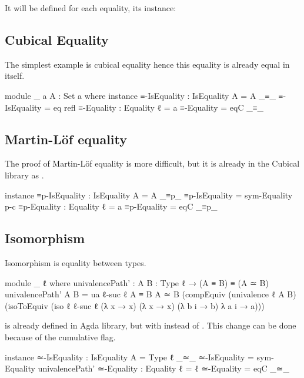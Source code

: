 \documentclass{article}
\begin{document}
It will be defined for each equality, its instance:

\subsection{Cubical Equality}

The simplest example is cubical equality hence this equality is already equal in itself.

\begin{code}
module _ {a} {A : Set a} where
  instance
    ≡-IsEquality : IsEquality {A = A} _≡_
    ≡-IsEquality = eq refl
  ≡-Equality : Equality {ℓ = a}
  ≡-Equality = eqC _≡_

\end{code}

\subsection{Martin-Löf equality}

The proof of Martin-Löf equality is more difficult, but it is already in the Cubical library as .

\begin{code}
  instance
    ≡p-IsEquality : IsEquality {A = A} _≡p_
    ≡p-IsEquality = sym-Equality p-c
  ≡p-Equality : Equality {ℓ = a}
  ≡p-Equality = eqC _≡p_
\end{code}

\subsection{Isomorphism}

Isomorphism is equality between types.

\begin{code}
module _ {ℓ} where
  univalencePath' : {A B : Type ℓ} → (A ≡ B) ≡ (A ≃ B)
  univalencePath' {A} {B} =
    ua {ℓ-suc ℓ} {A ≡ B} {A ≃ B} (compEquiv (univalence {ℓ} {A} {B})
    (isoToEquiv (iso {ℓ} {ℓ-suc ℓ}
    (λ x → x) (λ x → x) (λ b i → b) λ a i → a)))
\end{code}

 is already defined in Agda library, but with  instead of
. This change can be done because of the cumulative flag.

\begin{code}
  instance
    ≃-IsEquality : IsEquality
      {A = Type ℓ} _≃_
    ≃-IsEquality = sym-Equality univalencePath'
  ≃-Equality : Equality {ℓ = ℓ}
  ≃-Equality = eqC _≃_
\end{code}
\end{document}
